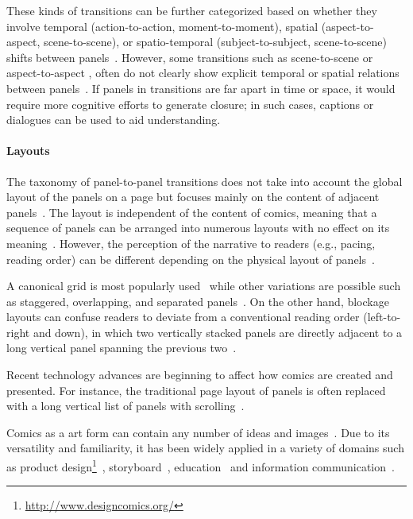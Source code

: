These kinds of transitions can be further categorized based on whether they involve temporal (action-to-action, moment-to-moment), spatial (aspect-to-aspect, scene-to-scene), or spatio-temporal (subject-to-subject, scene-to-scene) shifts between panels~\cite{cohn2003syntatic}. However, some transitions such as scene-to-scene or aspect-to-aspect , often do not clearly show explicit temporal or spatial relations between panels~\cite{cohn2003syntatic}. If panels in transitions are far apart in time or space, it would require more cognitive efforts to generate closure; in such cases, captions or dialogues can be used to aid understanding.


\paragraph{Layouts}

The taxonomy of panel-to-panel transitions does not take into account the global layout of the panels on a page but focuses mainly on the content of adjacent panels~\cite{caldwell2012comic}. The layout is independent of the content of comics, meaning that a sequence of panels can be arranged into numerous layouts with no effect on its meaning~\cite{cohn2014architecture}. However, the perception of the narrative to readers (e.g., pacing, reading order) can be different depending on the physical layout of panels~\cite{cohn2014architecture}. 

A canonical grid is most popularly used~\cite{postema2013narrative,abel2008drawing} while other variations are possible such as staggered, overlapping, and separated panels~\cite{cohn2014architecture}. On the other hand, blockage layouts can confuse readers to deviate from a conventional reading order (left-to-right and down), in which two vertically stacked panels are directly adjacent to a long vertical panel spanning the previous two~\cite{cohn2014architecture}. 

Recent technology advances are beginning to affect how comics are created and presented. For instance, the traditional page layout of panels is often replaced with a long vertical list of panels with scrolling~\cite{goodbrey2013digital}.

Comics as a art form can contain any number of ideas and images~\cite{mccloud1993understanding}. Due to its versatility and familiarity, it has been widely applied in a variety of domains such as product design\footnote{\url{http://www.designcomics.org/}}~\cite{moraveji2007comicboarding}, storyboard~\cite{haesen2010draw}, education~\cite{green2010graphic} and information communication~\cite{tatalovic2009science,caldwell2012information}. 